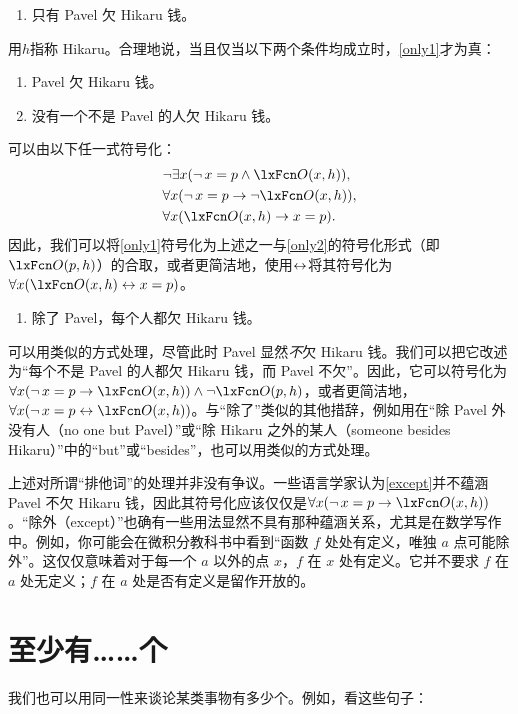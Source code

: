 \begin{enumerate}
\item\label{only1} 只有 Pavel 欠 Hikaru 钱。
\end{enumerate}

用$h$指称 Hikaru。合理地说，当且仅当以下两个条件均成立时，\cref*{only1}才为真：

\begin{enumerate}
	\item\label{only2} Pavel 欠 Hikaru 钱。
	\item\label{else3} 没有一个不是 Pavel 的人欠 Hikaru 钱。
\end{enumerate}

可以由以下任一式符号化：
\begin{align*}
	& \enot\exists x(\enot\, {x = p} \eand \atom{O}{x,h}),\\
	& \forall x(\enot\, {x = p} \eif \enot\atom{O}{x,h}),\\
	& \forall x(\atom{O}{x,h} \eif x = p).
\end{align*}
因此，我们可以将\cref*{only1}符号化为上述之一与\cref*{only2}的符号化形式（即$\atom{O}{p,h}$）的合取，或者更简洁地，使用$\leftrightarrow$将其符号化为$\forall x(\atom{O}{x,h} \eiff x = p)$。

\begin{enumerate}
	\item\label{except} 除了 Pavel，每个人都欠 Hikaru 钱。
	\end{enumerate}

可以用类似的方式处理，尽管此时 Pavel 显然\emph{不}欠 Hikaru 钱。我们可以把它改述为“每个不是 Pavel 的人都欠 Hikaru 钱，而 Pavel 不欠”。因此，它可以符号化为$\forall x(\enot\, {x = p} \eif \atom{O}{x,h}) \eand \enot \atom{O}{p,h}$，或者更简洁地，$\forall x(\enot\, {x = p} \eiff \atom{O}{x,h})$。与“除了”类似的其他措辞，例如用在“除 Pavel 外没有人（no one but Pavel）”或“除 Hikaru 之外的某人（someone besides Hikaru）”中的“but”或“besides”，也可以用类似的方式处理。

上述对所谓“排他词”的处理并非没有争议。一些语言学家认为\cref*{except}并不蕴涵 Pavel 不欠 Hikaru 钱，因此其符号化应该仅仅是$\forall x(\enot\, {x = p} \eif \atom{O}{x,h})$。“除外（except）”也确有一些用法显然不具有那种蕴涵关系，尤其是在数学写作中。例如，你可能会在微积分教科书中看到“函数 $f$ 处处有定义，唯独 $a$ 点可能除外”。这仅仅意味着对于每一个 $a$ 以外的点 $x$，$f$ 在 $x$ 处有定义。它并不要求 $f$ 在 $a$ 处无定义；$f$ 在 $a$ 处是否有定义是留作开放的。

\section{至少有……个}
我们也可以用同一性来谈论某类事物有多少个。例如，看这些句子：

